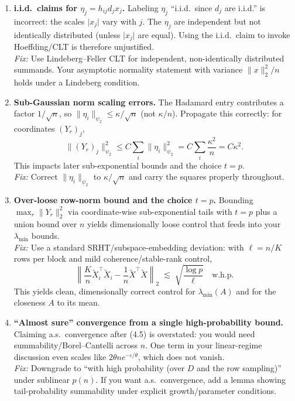 \documentclass[11pt]{article}
\theoremstyle{plain}
\begin{document}
\begin{enumerate}[leftmargin=*,label=\textbf{(\arabic*)}]
\item \textbf{i.i.d.\ claims for \(\eta_j=h_{ij}d_j x_j\).}
Labeling \(\eta_j\) ``i.i.d.\ since \(d_j\) are i.i.d.'' is incorrect: the scales \(\lvert x_j\rvert\) vary with \(j\). The \(\eta_j\) are independent but not identically distributed (unless \(\lvert x_j\rvert\) are equal). Using the i.i.d.\ claim to invoke Hoeffding/CLT is therefore unjustified.
\medskip\\
\emph{Fix:} Use Lindeberg--Feller CLT for independent, non-identically distributed summands. Your asymptotic normality statement with variance \(\|x\|_2^2/n\) holds under a Lindeberg condition.

\item \textbf{Sub-Gaussian norm scaling errors.}
The Hadamard entry contributes a factor \(1/\sqrt{n}\), so \(\|\eta_i\|_{\psi_2}\le \kappa/\sqrt{n}\) (not \(\kappa/n\)). Propagate this correctly: for coordinates \((Y_r)_j\), 
\[
\|(Y_r)_j\|_{\psi_2}^2 \le C\sum_i \|\eta_i\|_{\psi_2}^2 = C \sum_i \frac{\kappa^2}{n} = C\kappa^2.
\]
This impacts later sub-exponential bounds and the choice \(t=p\).
\medskip\\
\emph{Fix:} Correct \(\|\eta_i\|_{\psi_2}\) to \(\kappa/\sqrt{n}\) and carry the squares properly throughout.

\item \textbf{Over-loose row-norm bound and the choice \(t=p\).}
Bounding \(\max_r \|Y_r\|_2^2\) via coordinate-wise sub-exponential tails with \(t=p\) plus a union bound over \(n\) yields dimensionally loose control that feeds into your \(\lambda_{\min}\) bounds.
\medskip\\
\emph{Fix:} Use a standard SRHT/subspace-embedding deviation: with \(\ell=n/K\) rows per block and mild coherence/stable-rank control,
\begin{equation}
\label{eq:srht}
\left\|\frac{K}{n}\tilde X_i^\top \tilde X_i - \frac{1}{n}\tilde X^\top \tilde X\right\|_2
\;\lesssim\;
\sqrt{\frac{\log p}{\ell}}\quad\text{w.h.p.}
\end{equation}
This yields clean, dimensionally correct control for \(\lambda_{\min}(A)\) and for the closeness \(A\) to its mean.

\item \textbf{``Almost sure'' convergence from a single high-probability bound.}
Claiming a.s.\ convergence after (4.5) is overstated: you would need summability/Borel--Cantelli across \(n\). One term in your linear-regime discussion even scales like \(2\theta n e^{-\iota/\theta}\), which does not vanish.
\medskip\\
\emph{Fix:} Downgrade to ``with high probability (over \(D\) and the row sampling)'' under sublinear \(p(n)\). If you want a.s.\ convergence, add a lemma showing tail-probability summability under explicit growth/parameter conditions.
\end{enumerate}
\end{document}
